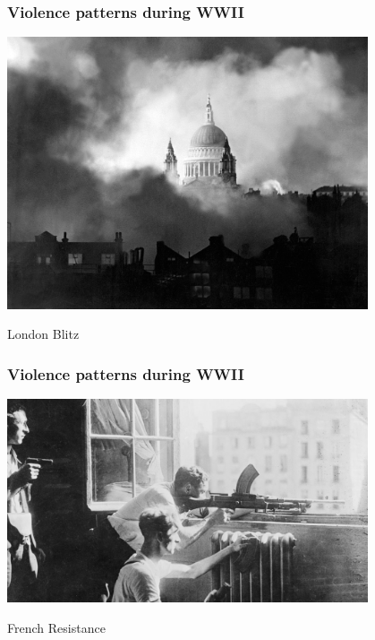 \documentclass[utf8, xcolor=dvipsnames, handout]{beamer}
\begin{document}
\begin{frame}
\frametitle{Violence patterns during WWII}
\centering

\includegraphics[width = 0.8\textwidth]{img/wwii-londonblitz}

London Blitz

\end{frame}

\begin{frame}
\frametitle{Violence patterns during WWII}
\centering

\includegraphics[width = 0.8\textwidth]{img/wwii-resistance}

French Resistance

\end{frame}
\end{document}
